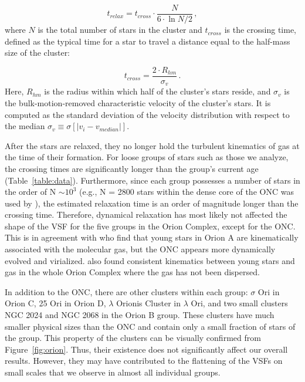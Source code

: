 \begin{equation}
t_{relax} = t_{cross} \cdot \frac{N}{6 \cdot \ln{N/2}} \,,
\end{equation}
where $N$ is the total number of stars in the cluster and $t_{cross}$ is the crossing time, defined as the typical time for a star to travel a distance equal to the half-mass size of the cluster:

\begin{equation}
t_{cross} =  \frac{2 \cdot R_{hm}}{\sigma_v} \,.
\end{equation}
Here, $R_{hm}$ is the radius within which half of the cluster's stars reside, and $\sigma_v$ is the bulk-motion-removed characteristic velocity of the cluster's stars. It is computed as the standard deviation of the velocity distribution with respect to the median \(\sigma_v \equiv \sigma [|v_i - v_{median}|]\).

After the stars are relaxed, they no longer hold the turbulent kinematics of gas at the time of their formation. For loose groups of stars such as those we analyze, the crossing times are significantly longer than the group's current age (Table~\ref{table:data}). Furthermore, since each group possesses a number of stars in the order of N $\sim 10^3$ (e.g., N = 2800 stars within the dense core of the ONC was used by \citet{hillenbrand_preliminary_1998}), the estimated relaxation time is an order of magnitude longer than the crossing time. Therefore, dynamical relaxation has most likely not affected the shape of the VSF for the five groups in the Orion Complex, except for the ONC\@. This is in agreement with \citet{da_rio_-sync_2017} who find that young stars in Orion A are kinematically associated with the molecular gas, but the ONC appears more dynamically evolved and virialized. \citet{kounkel_apogee-2_2018} also found consistent kinematics between young stars and gas in the whole Orion Complex where the gas has not been dispersed.

In addition to the ONC, there are other clusters within each group: $\sigma$ Ori in Orion C, 25 Ori in Orion D, $\lambda$ Orionis Cluster in $\lambda$ Ori, and two small clusters NGC 2024 and NGC 2068 in the Orion B group. These clusters have much smaller physical sizes than the ONC and contain only a small fraction of stars of the group. This property of the clusters can be visually confirmed from Figure~\ref{fig:orion}. Thus, their existence does not significantly affect our overall results. However, they may have contributed to the flattening of the VSFs on small scales that we observe in almost all individual groups.

